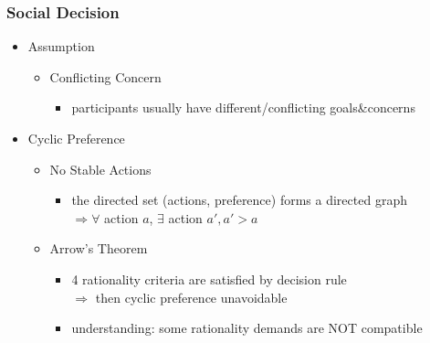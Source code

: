 \subsubsection{Social Decision}
\begin{itemize}
\item Assumption
	\begin{itemize}
	\item Conflicting Concern
		\begin{itemize}
		\item participants usually have different/conflicting goals\&concerns
		\end{itemize}
	\end{itemize}
\item Cyclic Preference
	\begin{itemize}
	\item No Stable Actions
		\begin{itemize}
		\item the directed set (actions, preference) forms a directed graph \\
		$\Rightarrow \forall$ action $a$, $\exists $ action $a', a' > a$
		\end{itemize}
	\item Arrow's Theorem
		\begin{itemize}
		\item 4 rationality criteria are satisfied by decision rule \\
		$\Rightarrow$ then cyclic preference unavoidable
		\item understanding: some rationality demands are NOT compatible
		\end{itemize}
	\end{itemize}
\end{itemize}


